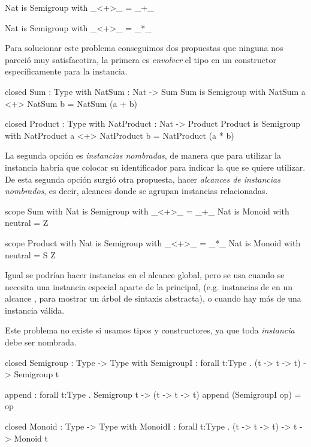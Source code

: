 {\begin{designfr}
\begin{anglercode}
Nat is Semigroup with
    _<+>_ = _+_

Nat is Semigroup with
    _<+>_ = _*_
\end{anglercode}

Para solucionar este problema conseguimos dos propuestas que ninguna nos pareció muy satisfacotira, la primera es \emph{envolver} el tipo en un constructor específicamente para la instancia.

\begin{anglercode}
closed Sum : Type with
    NatSum : Nat -> Sum
Sum is Semigroup with
    NatSum a <+> NatSum b = NatSum (a + b)

closed Product : Type with
    NatProduct : Nat -> Product
Product is Semigroup with
    NatProduct a <+> NatProduct b = NatProduct (a * b)
\end{anglercode}

La segunda opción es \emph{instancias nombradas}, de manera que para utilizar la instancia habría que colocar su identificador para indicar la que se quiere utilizar. De esta segunda opción surgió otra propuesta, hacer \emph{alcances de instancias nombrados}, es decir, alcances donde se agrupan instancias relacionadas.

\begin{anglercode}
scope Sum with
    Nat is Semigroup with
        _<+>_ = _+_
    Nat is Monoid with
        neutral = Z

scope Product with
    Nat is Semigroup with
        _<+>_ = _*_
    Nat is Monoid with
        neutral = S Z
\end{anglercode}

Igual se podrían hacer instancias en el alcance global, pero se usa cuando se necesita una instancia especial aparte de la principal, (e.g. instancias de  en un alcance , para mostrar un árbol de sintaxis abstracta), o cuando hay más de una instancia válida.

Este problema no existe si usamos tipos y constructores, ya que toda \emph{instancia} debe ser nombrada.

\begin{anglercode}
closed Semigroup : Type -> Type with
    SemigroupI : forall t:Type . (t -> t -> t) -> Semigroup t

append : forall t:Type . Semigroup t -> (t -> t -> t)
append (SemigroupI op) = op

closed Monoid : Type -> Type with
    MonoidI : forall t:Type . (t -> t -> t) -> t -> Monoid t


\end{anglercode}
\end{designfr}}
